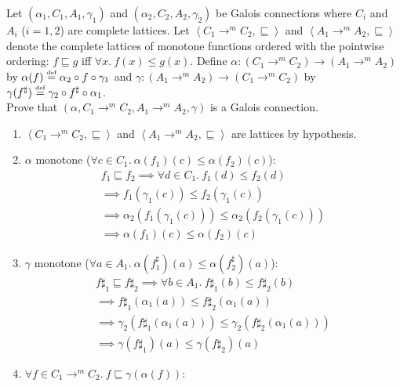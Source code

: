 \begin{exercise}{
    Let $(\alpha_1, C_1, A_1, \gamma_1)$ and $(\alpha_2, C_2, A_2, \gamma_2)$ be Galois connections where $C_i$ and $A_i$ ($i = 1,2$) are complete lattices. Let $\left<C_1 \to^m C_2, \sqsubseteq\right>$ and $\left<A_1 \to^m A_2, \sqsubseteq\right>$ denote the complete lattices of monotone functions ordered with the pointwise ordering: $f \sqsubseteq g$ iff $\forall x.\ f(x) \leq g(x)$. Define $\alpha : (C_1 \to^m C_2) \to (A_1 \to^m A_2)$ by $\alpha(f) \overset{\text{\tiny def}}{=} \alpha_2 \circ f \circ \gamma_1$ and $\gamma: (A_1 \to^m A_2) \to (C_1 \to^m C_2)$ by $\gamma(f^\sharp) \overset{\text{\tiny def}}{=} \gamma_2 \circ f^\sharp \circ \alpha_1$. \\
    Prove that $(\alpha, C_1 \to^m C_2, A_1 \to^m A_2, \gamma)$ is a Galois connection.
}
    \begin{enumerate}[1.]
        \item $\left<C_1 \to^m C_2, \sqsubseteq\right>$ and $\left<A_1 \to^m A_2, \sqsubseteq\right>$ are lattices by hypothesis.
        \item $\alpha$ monotone ($\forall c \in C_1.\ \alpha(f_1)(c) \leq \alpha(f_2)(c)$):
        \begin{gather*}
            f_1 \sqsubseteq f_2 \implies \forall d \in C_1.\ f_1 (d) \leq f_2 (d) \\
            \implies f_1 (\gamma_1 (c)) \leq f_2 (\gamma_1 (c)) \\
            \implies \alpha_2 (f_1 (\gamma_1 (c))) \leq \alpha_2 (f_2 (\gamma_1 (c))) \\
            \implies \alpha(f_1)(c) \leq \alpha(f_2)(c)
        \end{gather*}
        \item $\gamma$ monotone ($\forall a \in A_1.\ \alpha(f^\sharp_1)(a) \leq \alpha(f^\sharp_2)(a)$):
        \begin{gather*}
            f\sharp_1 \sqsubseteq f\sharp_2 \implies \forall b \in A_1.\ f\sharp_1 (b) \leq f\sharp_2 (b) \\
            \implies f\sharp_1 (\alpha_1 (a)) \leq f\sharp_2 (\alpha_1 (a)) \\
            \implies \gamma_2 (f\sharp_1 (\alpha_1 (a))) \leq \gamma_2 (f\sharp_2 (\alpha_1 (a))) \\
            \implies \gamma(f\sharp_1)(a) \leq \gamma(f\sharp_2)(a)
        \end{gather*}
        \item $\forall f \in C_1 \to^m C_2.\ f \sqsubseteq \gamma(\alpha(f))$:
        \begin{gather*}

\end{gather*}
\end{enumerate}
\end{exercise}
